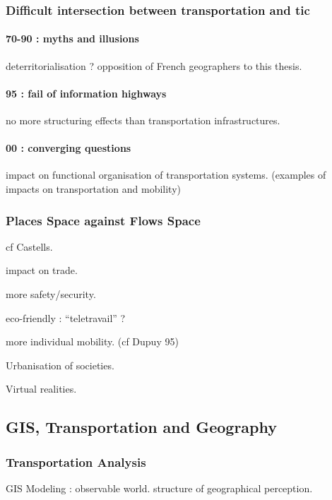 \subsubsection{Difficult intersection between transportation and tic}

\paragraph{70-90 : myths and illusions}

deterritorialisation ? opposition of French geographers to this thesis.

\paragraph{95 : fail of information highways}

no more structuring effects than transportation infrastructures.

\paragraph{00 : converging questions}

impact on functional organisation of transportation systems. (examples of impacts on transportation and mobility)

\subsubsection{Places Space against Flows Space}

cf Castells.

impact on trade.

more safety/security.

eco-friendly : ``teletravail'' ?

more individual mobility. (cf Dupuy 95)

Urbanisation of societies.

Virtual realities.


\subsection{GIS, Transportation and Geography}

\subsubsection{Transportation Analysis}

GIS Modeling : observable world. structure of geographical perception.

